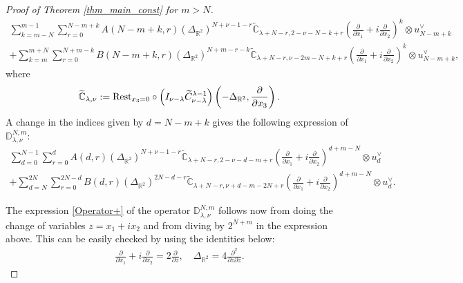 \documentclass[12pt, pdflatex, a4paper]{article}
\theoremstyle{plain}
\theoremstyle{definition}
\def\C{{\mathbb C}}
\def\D{\mathbb{D}}
\def\R{{\mathbb R}}
\def\Rest{\text{\normalfont{Rest}}}
\begin{document}
\begin{proof}[Proof of Theorem \ref{thm_main_const} for $m>N$]
\begin{align*}
\sum_{k=m-N}^{m-1}\sum_{r=0}^{N-m+k}  A(N-m+k,r) (\Delta_{\R^2})^{N+\nu-1-r} \widetilde{\C}_{\lambda+N-r, 2-\nu-N-k+r}\left(\frac{\partial}{\partial x_1} + i \frac{\partial}{\partial x_2}\right)^k\otimes u_{N-m+k}^\vee\\
+\sum_{k=m}^{m+N}\sum_{r=0}^{N+m-k}  B(N-m+k,r) (\Delta_{\R^2})^{N+m-r-k} \widetilde{\C}_{\lambda+N-r, \nu-2m-N+k +r}\left(\frac{\partial}{\partial x_1} + i \frac{\partial}{\partial x_2}\right)^k\otimes u_{N-m+k}^\vee,
\end{align*}
where
\begin{equation*}
\begin{gathered}
\widetilde{\C}_{\lambda, \nu} := \Rest_{x_3 = 0} \circ \left(I_{\nu-\lambda} \widetilde{C}^{\lambda-1}_{\nu-\lambda}\right)\left(-\Delta_{\R^2}, \frac{\partial}{\partial x_3}\right).
\end{gathered}
\end{equation*}
A change in the indices given by $d = N-m+k$ gives the following expression of $\D_{\lambda, \nu}^{N,m}$:
\begin{multline*}
\sum_{d=0}^{N-1}\sum_{r=0}^{d}  A(d,r) (\Delta_{\R^2})^{N+\nu-1-r} \widetilde{\C}_{\lambda+N-r, 2-\nu-d-m+r}\left(\frac{\partial}{\partial x_1} + i \frac{\partial}{\partial x_2}\right)^{d+m-N}\otimes u_{d}^\vee\\
+\sum_{d=N}^{2N}\sum_{r=0}^{2N-d}  B(d,r) (\Delta_{\R^2})^{2N-d-r} \widetilde{\C}_{\lambda+N-r, \nu+d-m-2N+r}\left(\frac{\partial}{\partial x_1} + i \frac{\partial}{\partial x_2}\right)^{d+m-N}\otimes u_{d}^\vee.
\end{multline*}

The expression \eqref{Operator+} of the operator $\D_{\lambda, \nu}^{N,m}$ follows now from doing the change of variables $z = x_1 + ix_2$ and from diving by $2^{N+m}$ in the expression above. This can be easily checked by using the identities below:
\begin{align*}
\frac{\partial}{\partial x_1} + i\frac{\partial}{\partial x_2} = 2 \frac{\partial}{\partial \overline{z}}, \quad \Delta_{\R^2} = 4\frac{\partial^2}{\partial z \partial \overline{z}}.
\end{align*}
\end{proof}
\end{document}
